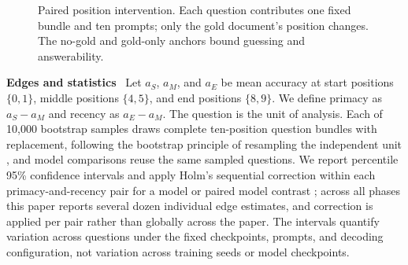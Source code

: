 \documentclass{article}
\newcommand{\runin}[1]{\par\medskip\noindent\textbf{#1}\ }
\begin{document}
\begin{figure}[t]
\centering
{}
\caption{Paired position intervention. Each question contributes one fixed bundle and ten prompts; only the gold document's position changes. The no-gold and gold-only anchors bound guessing and answerability.}
\label{fig:position-harness}
\end{figure}

\runin{Edges and statistics}
Let $a_S$, $a_M$, and $a_E$ be mean accuracy at start positions $\{0,1\}$, middle positions $\{4,5\}$, and end positions $\{8,9\}$.
We define primacy as $a_S-a_M$ and recency as $a_E-a_M$.
The question is the unit of analysis.
Each of 10{,}000 bootstrap samples draws complete ten-position question bundles with replacement, following the bootstrap principle of resampling the independent unit \citep{efron1979bootstrap}, and model comparisons reuse the same sampled questions.
We report percentile 95\% confidence intervals and apply Holm's sequential correction within each primacy-and-recency pair for a model or paired model contrast \citep{holm1979multiple}; across all phases this paper reports several dozen individual edge estimates, and correction is applied per pair rather than globally across the paper.
The intervals quantify variation across questions under the fixed checkpoints, prompts, and decoding configuration, not variation across training seeds or model checkpoints.
\end{document}
